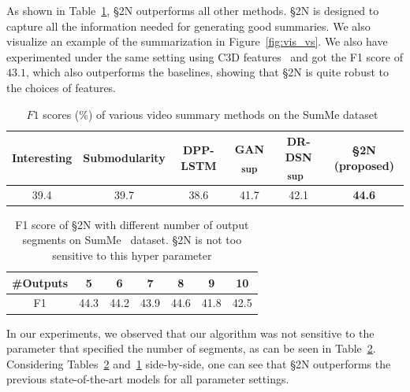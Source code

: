 \documentclass[10pt,journal,compsoc]{IEEEtran}
\begin{document}
 As shown in Table~\ref{results:vssum}, \S2N outperforms all other methods. \S2N is designed to capture all the information needed for generating good summaries. We also visualize an example of the summarization in Figure~\ref{fig:vis_vs}. We also have experimented under the same setting using C3D features~\cite{tran2015learning} and got the F1 score of $43.1$, which also outperforms the baselines, showing that \S2N is quite robust to the choices of features. 

\begin{table}
\small
\setlength{\tabcolsep}{5pt}
\centering
\caption{$F1$ scores (\%) of various video summary methods on the SumMe dataset~\cite{gygli2014creating} \label{results:vssum}}
\begin{tabular}{ c  c  c  c  c  c }
\toprule
 Interesting \cite{gygli2014creating} & Submodularity \cite{gygli2015video}  & DPP-LSTM \cite{zhang2016video} & GAN \textsubscript{sup} \cite{mahasseni2017unsupervised} & DR-DSN \textsubscript{sup}~\cite{zhou2017deep} & \S2N (proposed)\\
\midrule
 39.4 & 39.7 & 38.6 & 41.7& 42.1 & \textbf{44.6} \\
\bottomrule
\end{tabular}
\setlength{\tabcolsep}{0.1cm}
\end{table}


\begin{table}
 \centering
 \caption{F1 score of \S2N with different number of output segments on SumMe~\cite{gygli2014creating} dataset. \S2N is not too sensitive to this hyper parameter\label{tab:vary_len}}
 \begin{tabular}{ccccccc}
 \toprule
 \#Outputs  &  5 &  6 & 7 & 8 & 9 & 10  \\
 \midrule
 F1 &  44.3 & 44.2 & 43.9 & 44.6 & 41.8 & 42.5 \\
 \bottomrule
 \end{tabular}
 \end{table}

In our experiments, we observed that our algorithm was not sensitive to the parameter that specified the number of segments, as can be seen in Table~\ref{tab:vary_len}. Considering Tables~\ref{tab:vary_len} and~\ref{results:vssum} side-by-side, one can see that \S2N outperforms the previous state-of-the-art models for all parameter settings. 
\end{document}
